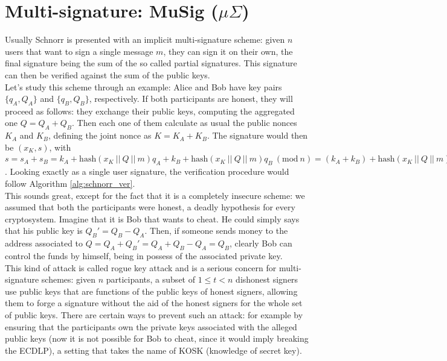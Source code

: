 \section{Multi-signature: MuSig ($\mu \Sigma$)}
\label{musig}
Usually Schnorr is presented with an implicit multi-signature scheme: given $n$ users that want to sign a single message $m$, they can sign it on their own, the final signature being the sum of the so called partial signatures. This signature can then be verified against the sum of the public keys.
\\
Let's study this scheme through an example: Alice and Bob have key pairs $\{q_A, Q_A\}$ and $\{q_B, Q_B\}$, respectively. If both participants are honest, they will proceed as follows: they exchange their public keys, computing the aggregated one $Q = Q_A + Q_B$. Then each one of them calculate as usual the public nonces $K_A$ and $K_B$, defining the joint nonce as $K = K_A + K_B$. The signature would then be $(x_K, s)$, with $s = s_A + s_B = k_A + \text{hash}(x_K \ || \ Q \ || \ m)q_A + k_B + \text{hash}(x_K \ || \ Q \ || \ m)q_B \ (\text{mod} \ n)= (k_A + k_B) + \text{hash}(x_K \ || \ Q \ || \ m)(q_A + q_B) \ (\text{mod} \ n)$. Looking exactly as a single user signature, the verification procedure would follow Algorithm \ref{alg:schnorr_ver}.
\\
This sounds great, except for the fact that it is a completely insecure scheme: we assumed that both the participants were honest, a deadly hypothesis for every cryptosystem. Imagine that it is Bob that wants to cheat. He could simply says that his public key is $Q_B' = Q_B - Q_A$. Then, if someone sends money to the address associated to $Q = Q_A + Q_B' = Q_A + Q_B - Q_A = Q_B$, clearly Bob can control the funds by himself, being in possess of the associated private key.
\\
This kind of attack is called rogue key attack and is a serious concern for multi-signature schemes: given $n$ participants, a subset of $1 \leq t < n$ dishonest signers use public keys that are functions of the public keys of honest signers, allowing them to forge a signature without the aid of the honest signers for the whole set of public keys. There are certain ways to prevent such an attack: for example by ensuring that the participants own the private keys associated with the alleged public keys (now it is not possible for Bob to cheat, since it would imply breaking the ECDLP), a setting that takes the name of KOSK (knowledge of secret key). 

